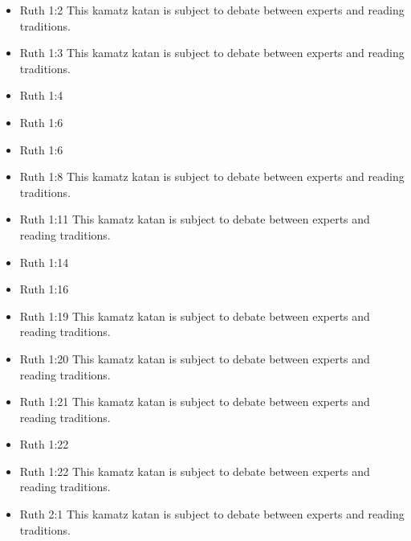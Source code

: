 \documentclass[14pt]{book}
\begin{document}
\begin{multicols}{2}\begin{itemize}
	
	\item Ruth 1:2 This kamatz katan is subject to debate between experts and reading traditions.
	
	\item Ruth 1:3 This kamatz katan is subject to debate between experts and reading traditions.
	
	\item Ruth 1:4
	
	\item Ruth 1:6
	
	\item Ruth 1:6
	
	\item Ruth 1:8 This kamatz katan is subject to debate between experts and reading traditions.
	
	\item Ruth 1:11 This kamatz katan is subject to debate between experts and reading traditions.
	
	\item Ruth 1:14
	
	\item Ruth 1:16
	
	\item Ruth 1:19 This kamatz katan is subject to debate between experts and reading traditions.
	
	\item Ruth 1:20 This kamatz katan is subject to debate between experts and reading traditions.
	
	\item Ruth 1:21 This kamatz katan is subject to debate between experts and reading traditions.
	
	\item Ruth 1:22
	
	\item Ruth 1:22 This kamatz katan is subject to debate between experts and reading traditions.
	
	\item Ruth 2:1 This kamatz katan is subject to debate between experts and reading traditions.
	

\end{itemize}
\end{multicols}
\end{document}
